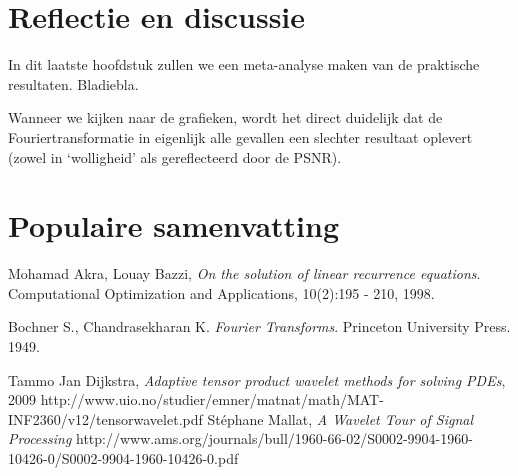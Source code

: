 \documentclass[11pt]{report}
\theoremstyle{plain}
\theoremstyle{remark}
\begin{document}
\chapter{Reflectie en discussie}
In dit laatste hoofdstuk zullen we een meta-analyse maken van de praktische resultaten. Bladiebla.

Wanneer we kijken naar de grafieken, wordt het direct duidelijk dat de Fouriertransformatie in eigenlijk alle gevallen een slechter resultaat oplevert (zowel in `wolligheid' als gereflecteerd door de PSNR).
\chapter{Populaire samenvatting}

\begin{thebibliography}{11}

  Mohamad Akra, Louay Bazzi,
  \emph{On the solution of linear recurrence equations}.
  Computational Optimization and Applications, 
  10(2):195 - 210,
  1998.

  Bochner S., Chandrasekharan K. 
  \emph{Fourier Transforms}. 
  Princeton University Press.
  1949.


Tammo Jan Dijkstra,
\emph{Adaptive tensor product wavelet methods for solving PDEs}, 2009
http://www.uio.no/studier/emner/matnat/math/MAT-INF2360/v12/tensorwavelet.pdf
St\'ephane Mallat,
\emph{A Wavelet Tour of Signal Processing}
http://www.ams.org/journals/bull/1960-66-02/S0002-9904-1960-10426-0/S0002-9904-1960-10426-0.pdf

\end{thebibliography}
\end{document}
